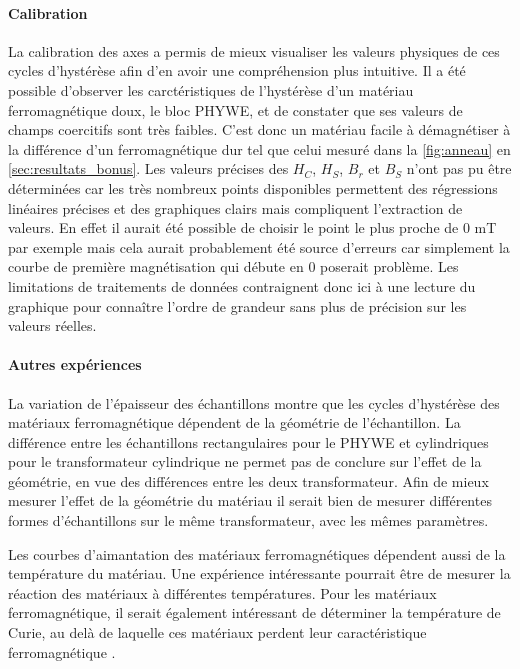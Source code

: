 \paragraph*{Calibration}
La calibration des axes a permis de mieux visualiser les valeurs physiques de ces cycles d'hystérèse afin d'en avoir une compréhension plus intuitive. Il a été possible d'observer les carctéristiques de l'hystérèse d'un matériau ferromagnétique doux, le bloc PHYWE, et de constater que ses valeurs de champs coercitifs sont très faibles. C'est donc un matériau facile à démagnétiser à la différence d'un ferromagnétique dur tel que celui mesuré dans la \autoref{fig:anneau} en \autoref{sec:resultats_bonus}. Les valeurs précises des \(H_C\), \(H_S\), \(B_r\) et \(B_S\) n'ont pas pu être déterminées car les très nombreux points disponibles permettent des régressions linéaires précises et des graphiques clairs mais compliquent l'extraction de valeurs. En effet il aurait été possible de choisir le point le plus proche de 0 \si{\milli\tesla} par exemple mais cela aurait probablement été source d'erreurs car simplement la courbe de première magnétisation qui débute en 0 poserait problème. Les limitations de traitements de données contraignent donc ici à une lecture du graphique pour connaître l'ordre de grandeur sans plus de précision sur les valeurs réelles.

\paragraph*{Autres expériences}
La variation de l'épaisseur des échantillons montre que les cycles d'hystérèse des matériaux ferromagnétique dépendent de la géométrie de l'échantillon. La différence entre les échantillons rectangulaires pour le PHYWE et cylindriques pour le transformateur cylindrique ne permet pas de conclure sur l'effet de la géométrie, en vue des différences entre les deux transformateur. Afin de mieux mesurer l'effet de la géométrie du matériau il serait bien de mesurer différentes formes d'échantillons sur le même transformateur, avec les mêmes paramètres.

Les courbes d'aimantation des matériaux ferromagnétiques dépendent aussi de la température du matériau. Une expérience intéressante pourrait être de mesurer la réaction des matériaux à différentes températures. Pour les matériaux ferromagnétique, il serait également intéressant de déterminer la température de Curie, au delà de laquelle ces matériaux perdent leur caractéristique ferromagnétique \cite{notice}.

